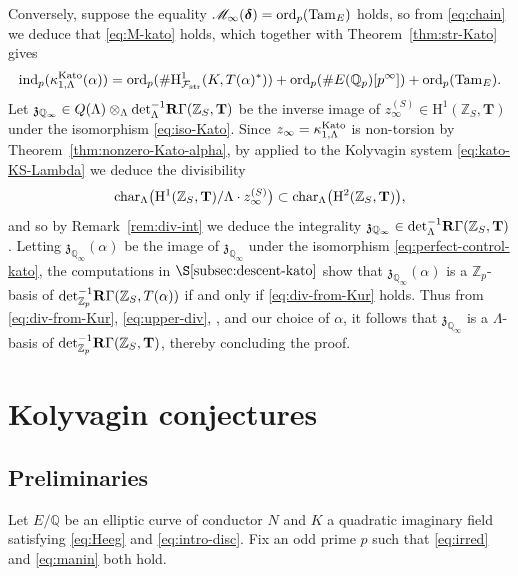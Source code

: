 \documentclass[10pt,reqno]{amsart}
\numberwithin{equation}{section}
\theoremstyle{plain}
\theoremstyle{definition}
\theoremstyle{definition}
\theoremstyle{plain}
\theoremstyle{plain}
\theoremstyle{plain}
\theoremstyle{plain}
\theoremstyle{plain}
\theoremstyle{plain}
\newcommand{\Tc}{\mathbf{T}}
\newcommand{\Z}{\mathbb{Z}}
\newcommand{\Q}{\mathbb{Q}}
\newcommand{\Fcal}{\mathcal{F}}
\newcommand{\rH}{\mathrm{H}}
\begin{document}
Conversely, suppose the equality  $\mathscr{M}_\infty(\boldsymbol{\delta})={\rm ord}_p({\rm Tam}_E)$ holds, so from \eqref{eq:chain} we deduce that \eqref{eq:M-kato} holds, which together with Theorem~\ref{thm:str-Kato} gives
\begin{equation}\label{eq:div-from-Kur}
{\rm ind}_p(\kappa_{1,\Lambda}^{\rm Kato}(\alpha))={\rm ord}_{p}(\#\rH^1_{\Fcal_{\rm str}}(K,T(\alpha)^*))+{\rm ord}_p(\#E(\Q_p)[p^\infty])+{\rm ord}_p({\rm Tam}_E).
\end{equation}
Let $\mathfrak{z}_{\Q_\infty}\in Q(\Lambda)\otimes_\Lambda{\rm det}_\Lambda^{-1}\mathbf{R}\Gamma(\Z_S,\Tc)$ be the inverse image of $z_\infty^{(S)}\in\rH^1(\Z_S,\Tc)$ under the isomorphism \eqref{eq:iso-Kato}. Since $z_\infty=\kappa_{1,\Lambda}^{\rm Kato}$ is non-torsion by Theorem~\ref{thm:nonzero-Kato-alpha}, by \cite[Thm.~5.3.10]{mazrub} applied to the Kolyvagin system \eqref{eq:kato-KS-Lambda} we deduce the divisibility 
\begin{equation}\label{eq:upper-div}
{\rm char}_\Lambda\bigl(\rH^1(\Z_S,\Tc)/\Lambda\cdot z_{\infty}^{(S)}\bigr)\subset{\rm char}_\Lambda\bigl(\rH^2(\Z_S,\Tc)\bigr),
\end{equation}
and so by Remark~\ref{rem:div-int} we deduce the integrality $\mathfrak{z}_{\Q_\infty}\in{\rm det}^{-1}_\Lambda\mathbf{R}\Gamma(\Z_S,\Tc)$. Letting $\mathfrak{z}_{\Q_\infty}(\alpha)$ be the image of $\mathfrak{z}_{\Q_\infty}$ under the isomorphism \eqref{eq:perfect-control-kato}, the computations in $\S\ref{subsec:descent-kato}$ show that $\mathfrak{z}_{\Q_\infty}(\alpha)$ is a $\Z_p$-basis of ${\rm det}_{\Z_p}^{-1}\mathbf{R}\Gamma(\Z_S,T(\alpha))$ if and only if \eqref{eq:div-from-Kur} holds. Thus from \eqref{eq:div-from-Kur}, \eqref{eq:upper-div},    \cite[Lem.~3.2]{skinner-urban}, and our choice of $\alpha$,  it follows that $\mathfrak{z}_{\Q_\infty}$ is a $\Lambda$-basis of ${\rm det}_{\Z_p}^{-1}\mathbf{R}\Gamma(\Z_S,\Tc)$, thereby concluding the proof.

\section{Kolyvagin conjectures}

\subsection{Preliminaries}

Let $E/\Q$ be an elliptic curve of conductor $N$ and $K$ a quadratic imaginary field satisfying \eqref{eq:Heeg} and \eqref{eq:intro-disc}. Fix an odd prime $p$ such that \eqref{eq:irred} and \eqref{eq:manin} both hold.
\end{document}
